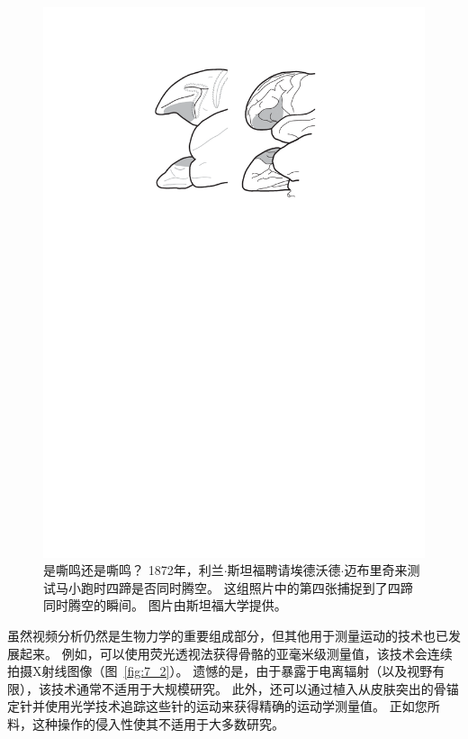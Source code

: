 \begin{figure}[!htb]
	\centering
	\includegraphics[width=1.0\linewidth]{chap7/7_1}
	\caption{是嘶鸣还是嘶鸣？
		1872年，利兰$\cdot$斯坦福聘请埃德沃德$\cdot$迈布里奇来测试马小跑时四蹄是否同时腾空。
		这组照片中的第四张捕捉到了四蹄同时腾空的瞬间。
		图片由斯坦福大学提供。 \label{fig:7_1}}
\end{figure}


虽然视频分析仍然是生物力学的重要组成部分，但其他用于测量运动的技术也已发展起来。
例如，可以使用荧光透视法获得骨骼的亚毫米级测量值，该技术会连续拍摄X射线图像（图~\ref{fig:7_2}）。
遗憾的是，由于暴露于电离辐射（以及视野有限），该技术通常不适用于大规模研究。
此外，还可以通过植入从皮肤突出的骨锚定针并使用光学技术追踪这些针的运动来获得精确的运动学测量值。
正如您所料，这种操作的侵入性使其不适用于大多数研究。


